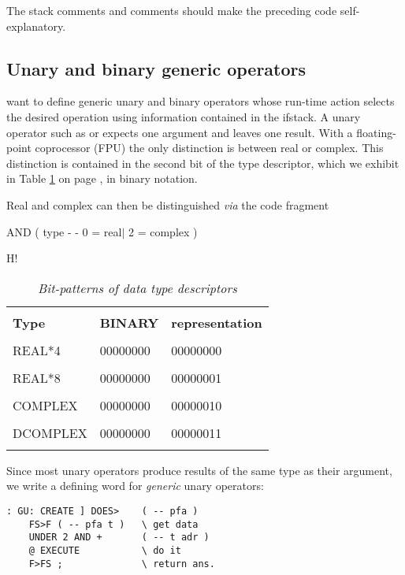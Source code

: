 The stack comments and comments should make the preceding code self-explanatory.

\subsection{Unary and binary generic operators}
\label{chap:05_02_06}
 want to define generic unary and binary operators whose run-time action selects the desired operation using information contained in the ifstack. A unary operator such as  or  expects one argument and leaves one result. With a floating-point coprocessor (FPU) the only distinction is between real or complex. This distinction is contained in the second bit of the type descriptor, which we exhibit in Table \ref{tbl:05_01} on page \pageref{tbl:05_01}, in binary notation.

Real and complex can then be distinguished \textit{via} the code fragment

 AND ( type - - 0 = real$\mid$ 2 = complex )

\begin{table}{H!}
    \centering
    \caption{\textit{Bit-patterns of data type descriptors}}
        \bigskip
    \label{tbl:05_01}
    \setlength{\tabcolsep}{30pt}
        \begin{tabular}{|lll|}
            \hline
            & &\\
            \textbf{Type} & \textbf{BINARY} & \textbf{representation} \\
            & &\\
            REAL*4     &  00000000 & 00000000 \\
            & &\\
            REAL*8     &  00000000 & 00000001 \\
            & &\\
            COMPLEX    &  00000000 & 00000010 \\
            & &\\
            DCOMPLEX   &  00000000 & 00000011 \\
            & &\\
            \hline 
        \end{tabular}
\end{table}

Since most unary operators produce results of the same type as their argument, we write a defining word for \textit{generic} unary operators:

\begin{lstlisting}
: GU: CREATE ] DOES>    ( -- pfa )
    FS>F ( -- pfa t )   \ get data
    UNDER 2 AND +       ( -- t adr )
    @ EXECUTE           \ do it
    F>FS ;              \ return ans.
\end{lstlisting}

